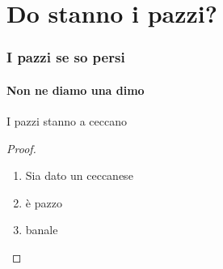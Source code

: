 \section{Do stanno i pazzi?}
\begin{frame}[<+->]
  \frametitle{I pazzi se so persi}
  \framesubtitle{Non ne diamo una dimo}
  \begin{teorema}
I pazzi stanno a ceccano
  \end{teorema}
  \begin{proof}
    \begin{enumerate}
    \item Sia dato un ceccanese
    \item è pazzo
    \item banale
    \end{enumerate}
  \end{proof}
\end{frame}
